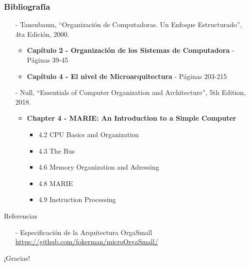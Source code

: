 \documentclass[aspectratio=169]{beamer}
\begin{document}
\begin{frame}[fragile]
    \frametitle{Bibliografía}
    \begin{itemize}
     \setlength\itemsep{0.5cm}
    \item[-] \small Tanenbaum, “Organización de Computadoras. Un Enfoque Estructurado”, 4ta Edición, 2000.\\
    \begin{itemize}
     \item \textbf{Capítulo 2 - Organización de los Sistemas de Computadora} - Páginas 39-45
     \item \textbf{Capítulo 4 - El nivel de Microarquitectura} - Páginas 203-215
    \end{itemize}
    \item[-] \small Null, “Essentials of Computer Organization and Architecture”, 5th Edition, 2018.\\
    \begin{itemize}
     \item \textbf{Chapter 4 - MARIE: An Introduction to a Simple Computer}
     \begin{itemize}
     \item 4.2 CPU Basics and Organization
     \item 4.3 The Bus
     \item 4.6 Memory Organization and Adressing
     \item 4.8 MARIE
     \item 4.9 Instruction Processing
     \end{itemize}
    \end{itemize}
    \end{itemize}
     \textcolor{naranjauca}{Referencias}
     \begin{itemize}
    \item[-] Especificación de la Arquitectura OrgaSmall\\ \small \url{https://github.com/fokerman/microOrgaSmall/}
    \end{itemize}
\end{frame}


\begin{frame}[plain]
    \begin{center}
    \vspace{2cm}
    \huge ¡Gracias!\\
    \vspace{2cm}
    \end{center}
\end{frame}
\end{document}
